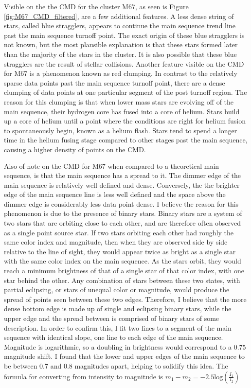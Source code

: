 \documentclass[aps,prb,twocolumn,groupedaddress,nofootinbib,floatfix]{revtex4-1}
\begin{document}
Visible on the the CMD for the cluster M67, as seen is Figure \ref{fig:M67_CMD_filtered}, are a few additional features. A less dense string of stars, called blue stragglers, appears to continue the main sequence trend line past the main sequence turnoff point. The exact origin of these blue stragglers is not known, but the most plausible explanation is that these stars formed later than the majority of the stars in the cluster. It is also possible that these blue stragglers are the result of stellar collisions. Another feature visible on the CMD for M67 is a phenomenon known as red clumping. In contrast to the relatively sparse data points past the main sequence turnoff point, there are a dense clumping of data points at one particular segment of the post turnoff region. The reason for this clumping is that when lower mass stars are evolving off of the main sequence, their hydrogen core has fused into a core of helium. Stars build up a core of helium until a point where the conditions are right for helium fusion to spontaneously begin, known as a helium flash. Stars tend to spend a longer time in the helium fusing stage compared to other stages past the main sequence, causing a higher density of points on the CMD.

Also of note on the CMD for M67 when compared to a theoretical main sequence, is that the main sequence has a spread to it. The dimmer edge of the main sequence is relatively well defined and dense. Conversely, the the brighter edge of the main sequence line is less well defined and the space above the dimmer edge is considerably less data point dense. I believe the reason for this phenomenon is due to the presence of binary stars. Binary stars are a system of two stars that are orbiting close to each other, and are therefore often observed as a single point source star. If two stars orbiting each other had roughly the same color index and magnitude, then when they are observed side by side relative to the line of sight, they would appear twice as bright as a single star with the same color index on the main sequence. As the stars orbit, they would reach a minimum brightness of that of a single star of that color index, with one star behind the other. Any combination of stars between these two states, with partial eclipsing, or stars of unequal color or magnitude, would produce the spread of points seen between these two edges. Therefore, I believe that the more dense bottom edge is made up of single and eclipsing binary stars, while the upper edge and the spread between is comprised of binary stars of some description. In order to confirm this, I fit two lines to a segment of the main sequence with identical slope, one line to each edge of the main sequence. Magnitude is logarithmic, so a doubling in brightness would correspond to a 0.75 magnitude shift. I found that the lower and upper edges of the main sequence to be between 0.7 and 0.8 magnitudes apart, helping to solidify this idea. The formula for converting from intensity to magnitude is $m_1-m_2 = -2.5\text{log}\left(\frac{I_1}{I_2}\right)$
\end{document}
